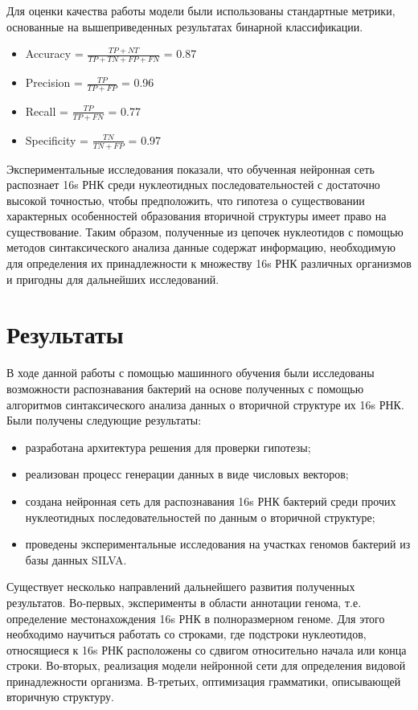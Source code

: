 \documentclass[14pt]{matmex-diploma}
\begin{document}
Для оценки качества работы модели были использованы стандартные метрики, основанные на вышеприведенных результатах бинарной классификации.
\begin{itemize}
    \item Accuracy = $\frac{TP+NT}{TP+TN+FP+FN}$ = 0.87
    \item Precision = $\frac{TP}{TP+FP}$ = 0.96
    \item Recall = $\frac{TP}{TP+FN}$ = 0.77
    \item Specificity = $\frac{TN}{TN+FP}$ = 0.97
\end{itemize}


Экспериментальные исследования показали, что обученная нейронная сеть распознает 16s РНК среди нуклеотидных последовательностей с достаточно высокой точностью, чтобы предположить, что гипотеза о существовании характерных особенностей образования вторичной структуры имеет право на существование. Таким образом, полученные из цепочек нуклеотидов с помощью методов синтаксического анализа данные содержат информацию, необходимую для определения их принадлежности к множеству 16s РНК различных организмов и пригодны для дальнейших исследований.


\section{Результаты}
В ходе данной работы с помощью машинного обучения были исследованы возможности распознавания бактерий на основе полученных с помощью алгоритмов синтаксического анализа данных о вторичной структуре их 16s РНК. Были получены следующие результаты:
\begin{itemize}
    \item разработана архитектура решения для проверки гипотезы;
    \item реализован процесс генерации данных в виде числовых векторов;
    \item создана нейронная сеть для распознавания 16s РНК бактерий среди прочих нуклеотидных последовательностей по данным о вторичной структуре;
    \item проведены экспериментальные исследования на участках геномов
    бактерий из базы данных SILVA.
\end{itemize}

Существует несколько направлений дальнейшего развития полученных результатов. Во-первых, эксперименты в области аннотации генома, т.е. определение местонахождения 16s РНК в полноразмерном геноме. Для этого необходимо научиться работать со строками, где подстроки нуклеотидов, относящиеся к 16s РНК расположены со сдвигом относительно начала или конца строки. Во-вторых, реализация модели нейронной сети для определения видовой принадлежности организма. В-третьих, оптимизация грамматики, описывающей вторичную структуру.

\setmonofont[Mapping=tex-text]{CMU Typewriter Text}


\end{document}
